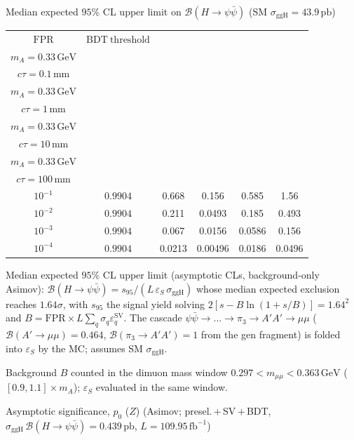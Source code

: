 \documentclass[10pt,a4paper]{article}
\begin{document}
{\vspace{12pt}

Median expected $95\%$ CL upper limit on $\mathcal{B}(H\to\psi\bar{\psi})$ (SM $\sigma_{\mathrm{ggH}}=43.9\,\mathrm{pb}$)

\begin{tabular}{cccccc}
\toprule
$\mathrm{FPR}$ & $\mathrm{BDT\ threshold}$ & \shortstack{$m_{\pi}=1\,\mathrm{GeV}$\\$m_{A}=0.33\,\mathrm{GeV}$\\$c\tau=0.1\,\mathrm{mm}$} & \shortstack{$m_{\pi}=1\,\mathrm{GeV}$\\$m_{A}=0.33\,\mathrm{GeV}$\\$c\tau=1\,\mathrm{mm}$} & \shortstack{$m_{\pi}=1\,\mathrm{GeV}$\\$m_{A}=0.33\,\mathrm{GeV}$\\$c\tau=10\,\mathrm{mm}$} & \shortstack{$m_{\pi}=1\,\mathrm{GeV}$\\$m_{A}=0.33\,\mathrm{GeV}$\\$c\tau=100\,\mathrm{mm}$} \\
\midrule
$10^{-1}$ & $0.9904$ & 0.668 & 0.156 & 0.585 & 1.56\\
$10^{-2}$ & $0.9904$ & 0.211 & 0.0493 & 0.185 & 0.493\\
$10^{-3}$ & $0.9904$ & 0.067 & 0.0156 & 0.0586 & 0.156\\
$10^{-4}$ & $0.9904$ & 0.0213 & 0.00496 & 0.0186 & 0.0496\\
\bottomrule
\end{tabular}

{\small Median expected $95\%$ CL upper limit (asymptotic CLs, background-only Asimov): $\mathcal{B}(H\to\psi\bar{\psi})=s_{95}/(L\,\varepsilon_S\,\sigma_{\mathrm{ggH}})$ whose median expected exclusion reaches $1.64\sigma$, with $s_{95}$ the signal yield solving $2[s-B\ln(1{+}s/B)]=1.64^2$ and $B=\mathrm{FPR}\times L\sum_q\sigma_q\varepsilon_q^{\mathrm{SV}}$. The cascade $\psi\bar{\psi}\to\ldots\to\pi_3\to A'A'\to\mu\mu$ ($\mathcal{B}(A'\to\mu\mu)=0.464$, $\mathcal{B}(\pi_3\to A'A')=1$ from the gen fragment) is folded into $\varepsilon_S$ by the MC; assumes SM $\sigma_{\mathrm{ggH}}$.}

{\small Background $B$ counted in the dimuon mass window $0.297<m_{\mu\mu}<0.363\,\mathrm{GeV}$ ($[0.9,1.1]\times m_A$); $\varepsilon_S$ evaluated in the same window.}

\vspace{12pt}

Asymptotic significance, $p_0$ ($Z$) (Asimov; presel.\,$+$\,SV\,$+$\,BDT, $\sigma_{\mathrm{ggH}}\,\mathcal{B}(H\to\psi\bar{\psi})=0.439\,\mathrm{pb}$, $L=109.95\,\mathrm{fb}^{-1}$)

}
\end{document}
